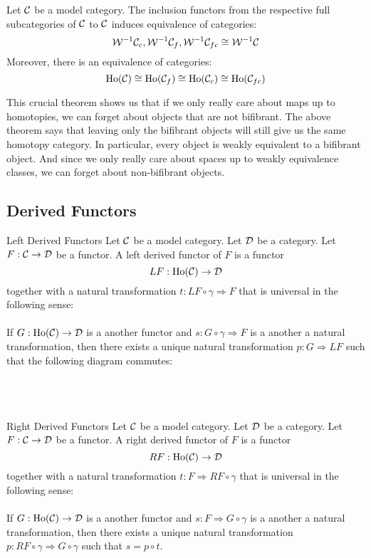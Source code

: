 \documentclass[a4paper]{article}
\begin{document}
\begin{thm}{}{} Let $\mathcal{C}$ be a model category. The inclusion functors from the respective full subcategories of $\mathcal{C}$ to $\mathcal{C}$ induces equivalence of categories: $$\mathcal{W}^{-1}\mathcal{C}_c,\mathcal{W}^{-1}\mathcal{C}_f,\mathcal{W}^{-1}\mathcal{C}_{fc}\cong\mathcal{W}^{-1}\mathcal{C}$$ Moreover, there is an equivalence of categories: $$\text{Ho}(\mathcal{C})\cong\text{Ho}(\mathcal{C}_f)\cong\text{Ho}(\mathcal{C}_c)\cong\text{Ho}(\mathcal{C}_{fc})$$
\end{thm}

This crucial theorem shows us that if we only really care about maps up to homotopies, we can forget about objects that are not bifibrant. The above theorem says that leaving only the bifibrant objects will still give us the same homotopy category. In particular, every object is weakly equivalent to a bifibrant object. And since we only really care about spaces up to weakly equivalence classes, we can forget about non-bifibrant objects. 

\subsection{Derived Functors}
\begin{defn}{Left Derived Functors}{} Let $\mathcal{C}$ be a model category. Let $\mathcal{D}$ be a category. Let $F:\mathcal{C}\to\mathcal{D}$ be a functor. A left derived functor of $F$ is a functor $$LF:\text{Ho}(\mathcal{C})\to\mathcal{D}$$ together with a natural transformation $t:LF\circ\gamma\Rightarrow F$ that is universal in the following sense: \\~\\

If $G:\text{Ho}(\mathcal{C})\to\mathcal{D}$ is a another functor and $s:G\circ\gamma\Rightarrow F$ is a another a natural transformation, then there exists a unique natural transformation $p:G\Rightarrow LF$ such that the following diagram commutes: \\~\\
\\~\\
\end{defn}

\begin{defn}{Right Derived Functors}{} Let $\mathcal{C}$ be a model category. Let $\mathcal{D}$ be a category. Let $F:\mathcal{C}\to\mathcal{D}$ be a functor. A right derived functor of $F$ is a functor $$RF:\text{Ho}(\mathcal{C})\to\mathcal{D}$$ together with a natural transformation $t:F\Rightarrow RF\circ\gamma$ that is universal in the following sense: \\~\\

If $G:\text{Ho}(\mathcal{C})\to\mathcal{D}$ is a another functor and $s:F\Rightarrow G\circ\gamma$ is a another a natural transformation, then there exists a unique natural transformation $p:RF\circ\gamma\Rightarrow G\circ\gamma$ such that $s=p\circ t$. 
\end{defn}
\end{document}
